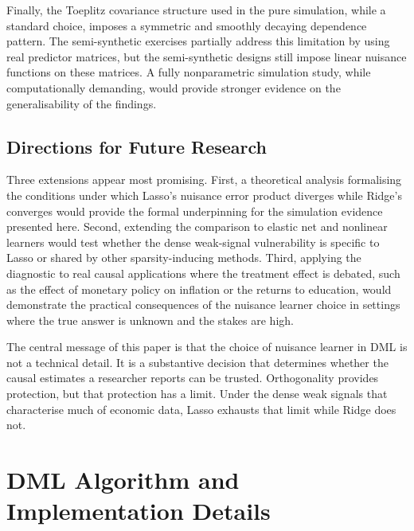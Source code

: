 \documentclass[a4paper,10.5pt]{article}
\begin{document}
Finally, the Toeplitz covariance structure used in the pure simulation, while a standard choice, imposes a symmetric and smoothly decaying dependence pattern. The semi-synthetic exercises partially address this limitation by using real predictor matrices, but the semi-synthetic designs still impose linear nuisance functions on these matrices. A fully nonparametric simulation study, while computationally demanding, would provide stronger evidence on the generalisability of the findings.


\subsection*{Directions for Future Research}

Three extensions appear most promising. First, a theoretical analysis formalising the conditions under which Lasso's nuisance error product diverges while Ridge's converges would provide the formal underpinning for the simulation evidence presented here. Second, extending the comparison to elastic net and nonlinear learners would test whether the dense weak-signal vulnerability is specific to Lasso or shared by other sparsity-inducing methods. Third, applying the diagnostic to real causal applications where the treatment effect is debated, such as the effect of monetary policy on inflation or the returns to education, would demonstrate the practical consequences of the nuisance learner choice in settings where the true answer is unknown and the stakes are high.

The central message of this paper is that the choice of nuisance learner in DML is not a technical detail. It is a substantive decision that determines whether the causal estimates a researcher reports can be trusted. Orthogonality provides protection, but that protection has a limit. Under the dense weak signals that characterise much of economic data, Lasso exhausts that limit while Ridge does not.


\newpage




\appendix

\section{DML Algorithm and Implementation Details}\label{app:algorithm}
\end{document}
